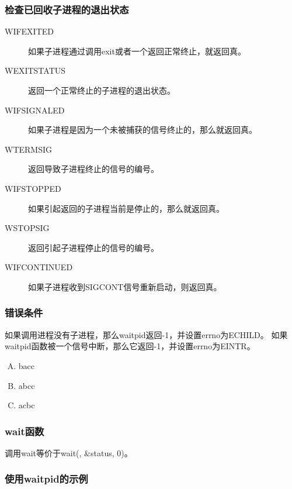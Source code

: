 {{        \subsubsection{检查已回收子进程的退出状态}
        {
            \begin{description}
                \item[WIFEXITED] 如果子进程通过调用exit或者一个返回正常终止，就返回真。
                \item[WEXITSTATUS] 返回一个正常终止的子进程的退出状态。
                \item[WIFSIGNALED] 如果子进程是因为一个未被捕获的信号终止的，那么就返回真。
                \item[WTERMSIG] 返回导致子进程终止的信号的编号。
                \item[WIFSTOPPED] 如果引起返回的子进程当前是停止的，那么就返回真。
                \item[WSTOPSIG]  返回引起子进程停止的信号的编号。
                \item[WIFCONTINUED] 如果子进程收到SIGCONT信号重新启动，则返回真。
            \end{description}
        }

        \subsubsection{错误条件}
        {
            如果调用进程没有子进程，那么waitpid返回-1，并设置errno为ECHILD。
            如果waitpid函数被一个信号中断，那么它返回-1，并设置errno为EINTR。

        \begin{practicec}
            \begin{enumerate}[A.]
                \item bacc
                \item abcc
                \item acbc
            \end{enumerate}
        \end{practicec}
        }

        \subsubsection{wait函数}
        {
            调用wait等价于wait(, \&status, 0)。
        }

        \subsubsection{使用waitpid的示例}
        {

        }
    }
}
